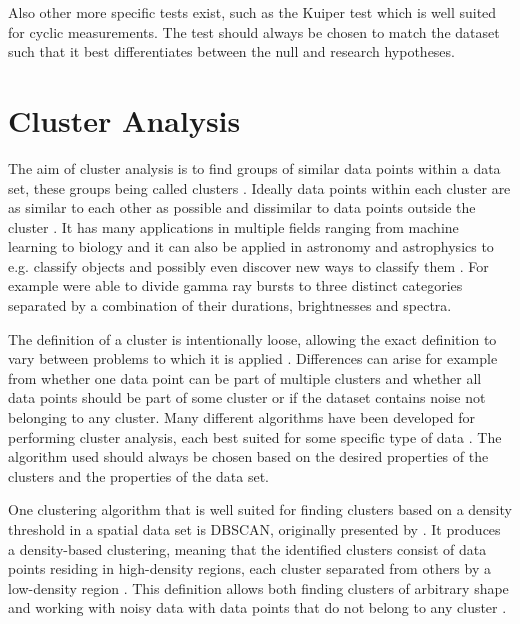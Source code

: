 \documentclass[english, oneside]{HYgradu}
\begin{document}
Also other more specific tests exist, such as the Kuiper test which is well suited for cyclic measurements. The test should always be chosen to match the dataset such that it best differentiates between the null and research hypotheses.

\section{Cluster Analysis} \label{sect:cluster-analysis}
The aim of cluster analysis is to find groups of similar data points within a data set, these groups being called clusters \citep{han2000data}. Ideally data points within each cluster are as similar to each other as possible and dissimilar to data points outside the cluster \citep{han2000data}. It has many applications in multiple fields ranging from machine learning to biology and it can also be applied in astronomy and astrophysics to e.g. classify objects and possibly even discover new ways to classify them \citep{ball2010data, han2000data}. For example \citet{mukherjee1998three} were able to divide gamma ray bursts to three distinct categories separated by a combination of their durations, brightnesses and spectra.

The definition of a cluster is intentionally loose, allowing the exact definition to vary between problems to which it is applied \citep{tan2006introduction}. Differences can arise for example from whether one data point can be part of multiple clusters and whether all data points should be part of some cluster or if the dataset contains noise not belonging to any cluster. Many different algorithms have been developed for performing cluster analysis, each best suited for some specific type of data \citep{han2000data}. The algorithm used should always be chosen based on the desired properties of the clusters and the properties of the data set.

One clustering algorithm that is well suited for finding clusters based on a density threshold in a spatial data set is DBSCAN, originally presented by \citet{ester1996density}. It produces a density-based clustering, meaning that the identified clusters consist of data points residing in high-density regions, each cluster separated from others by a low-density region \citep{han2000data}. This definition allows both finding clusters of arbitrary shape and working with noisy data with data points that do not belong to any cluster \citep{ester1996density}.
\end{document}
